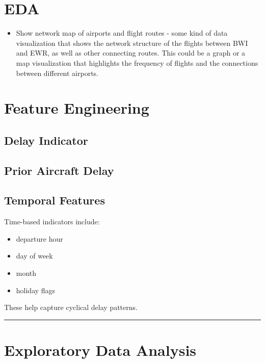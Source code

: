 \documentclass[
  letterpaper,
  DIV=11,
  numbers=noendperiod]{scrartcl}
\providecommand{\tightlist}{%
  \setlength{\itemsep}{0pt}\setlength{\parskip}{0pt}}
\begin{document}
\section{EDA}\label{eda}

\begin{itemize}
\tightlist
\item
  Show network map of airports and flight routes - some kind of data
  visualization that shows the network structure of the flights between
  BWI and EWR, as well as other connecting routes. This could be a graph
  or a map visualization that highlights the frequency of flights and
  the connections between different airports.
\end{itemize}

\section{Feature Engineering}\label{feature-engineering-1}

\subsection{Delay Indicator}\label{delay-indicator}

\subsection{Prior Aircraft Delay}\label{prior-aircraft-delay}

\subsection{Temporal Features}\label{temporal-features}

Time-based indicators include:

\begin{itemize}
\tightlist
\item
  departure hour
\item
  day of week
\item
  month
\item
  holiday flags
\end{itemize}

These help capture cyclical delay patterns.

\begin{center}\rule{0.5\linewidth}{0.5pt}\end{center}

\section{Exploratory Data Analysis}\label{exploratory-data-analysis}
\end{document}
